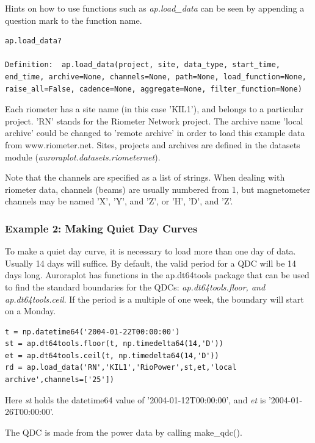 \documentclass{article}
\begin{document}
Hints on how to use functions such as {\it ap.load\_data} can be seen by appending a question mark to the function name.

\begin{lstlisting}[style=pythonstyle]
ap.load_data?

Definition:  ap.load_data(project, site, data_type, start_time, end_time, archive=None, channels=None, path=None, load_function=None, raise_all=False, cadence=None, aggregate=None, filter_function=None)
\end{lstlisting}

Each riometer has a site name (in this case 'KIL1'), and belongs to a particular project. 'RN' stands for the Riometer Network project. The archive name 'local archive' could be changed to 'remote archive' in order to load this example data from www.riometer.net. Sites, projects and archives are defined in the datasets module ({\it auroraplot.datasets.riometernet}).

Note that the channels are specified as a list of strings. When dealing with riometer data, channels (beams) are usually numbered from 1, but magnetometer channels may be named 'X', 'Y', and 'Z', or 'H', 'D', and 'Z'.


\subsubsection{Example 2: Making Quiet Day Curves}

To make a quiet day curve, it is necessary to load more than one day of data. Usually 14 days will suffice. By default, the valid period for a QDC will be 14 days long.
Auroraplot has functions in the ap.dt64tools package that can be used to find the standard boundaries for the QDCs: {\it ap.dt64tools.floor, and ap.dt64tools.ceil}. If the period is a multiple of one week, the boundary will start on a Monday.

\begin{lstlisting}[style=pythonstyle]
t = np.datetime64('2004-01-22T00:00:00')
st = ap.dt64tools.floor(t, np.timedelta64(14,'D'))
et = ap.dt64tools.ceil(t, np.timedelta64(14,'D'))
rd = ap.load_data('RN','KIL1','RioPower',st,et,'local archive',channels=['25'])
\end{lstlisting}

Here {\it st} holds the datetime64 value of '2004-01-12T00:00:00', and {\it et} is '2004-01-26T00:00:00'.

The QDC is made from the power data by calling make\_qdc().
\end{document}
